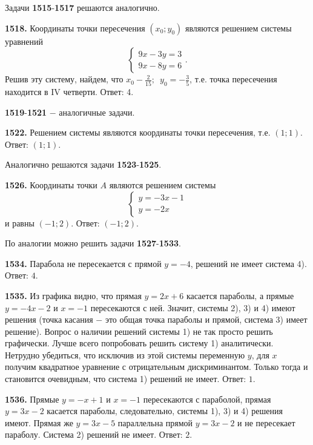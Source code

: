Задачи \textbf{1515}-\textbf{1517} решаются аналогично. 

\textbf{1518.} Координаты точки пересечения $(x_0;y_0)$ являются решением системы уравнений $$
			\begin{cases}
				9x-3y=3
				\\
				9x-8y=6
			\end{cases}
		  .$$
Решив эту систему, найдем, что $x_0-\frac{2}{15};\enspace y_0=-\frac{3}{5}$, т.е. точка пересечения находится в  IV четверти.          Ответ: 4.

\textbf{1519}-\textbf{1521} $-$ аналогичные задачи.

\textbf{1522.} Решением системы являются координаты точки пересечения, т.е. $(1;1)$. \newline \null \hspace*{\fill} Ответ: $(1;1)$.

Аналогично решаются задачи  \textbf{1523}-\textbf{1525}.

\textbf{1526.} Координаты точки $A$ являются решением системы $$\begin{cases}
	y=-3x-1
	\\
	y=-2x	
\end{cases}$$  и равны $(-1;2)$. \newline \null \hspace*{\fill} Ответ: $(-1;2)$. 

По аналогии можно решить задачи  \textbf{1527}-\textbf{1533}.

\textbf{1534.}  Парабола не пересекается с прямой $y=-4$, решений не имеет система 4). \newline \null \hspace*{\fill} Ответ: $4$.

\textbf{1535.}  Из графика видно, что прямая $y=2x+6$ касается параболы, а прямые $y=-4x-2$ и $x=-1$ пересекаются с ней. Значит, системы 2), 3) и 4) имеют решения (точка касания $-$ это общая точка параболы и прямой, система 3) имеет решение). Вопрос о наличии решений системы 1) не так просто решить графически. Лучше всего попробовать решить систему 1) аналитически. Нетрудно убедиться, что исключив из этой системы переменную $y$, для $x$ получим квадратное уравнение с отрицательным дискриминантом. Только тогда и становится очевидным, что система 1) решений не имеет. \newline \null \hspace*{\fill} Ответ: $1$. 

\textbf{1536.} Прямые $y=-x+1$ и $x=-1$ пересекаются с параболой, прямая $y=3x-2$ касается параболы, следовательно, системы 1), 3) и 4) решения имеют. Прямая же $y=3x-5$ параллельна прямой $y=3x-2$ и не пересекает параболу.  Система 2) решений не имеет. \newline \null \hspace*{\fill} Ответ: $2$.

